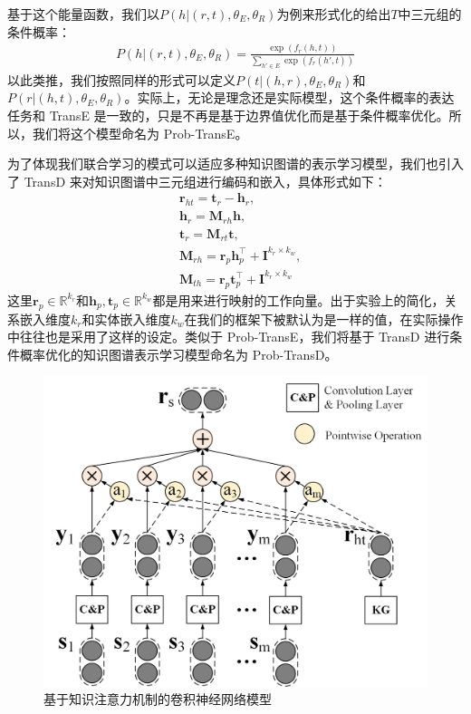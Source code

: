 基于这个能量函数，我们以$P(h|(r, t),{\theta_E, \theta_R})$为例来形式化的给出$T$中三元组的条件概率：
\begin{align}
P(h|(r, t),{\theta_E, \theta_R}) = \frac{\exp(f_r(h, t))}{\sum_{h' \in E} \exp(f_r(h', t))}
\end{align}
以此类推，我们按照同样的形式可以定义$P(t|(h, r), {\theta_E, \theta_R})$和$P(r|(h, t),{\theta_E, \theta_R})$。实际上，无论是理念还是实际模型，这个条件概率的表达任务和 TransE 是一致的，只是不再是基于边界值优化而是基于条件概率优化。所以，我们将这个模型命名为 Prob-TransE。

为了体现我们联合学习的模式可以适应多种知识图谱的表示学习模型，我们也引入了 TransD 来对知识图谱中三元组进行编码和嵌入，具体形式如下：
\begin{align}
&\textbf{r}_{ht} = \textbf{t}_{r} - \textbf{h}_{r}, \\\nonumber
&\textbf{h}_{r}  = \textbf{M}_{rh}\textbf{h},\\\nonumber 
&\textbf{t}_{r} = \textbf{M}_{rt}\textbf{t}, \\\nonumber
&\textbf{M}_{rh} = \textbf{r}_p\textbf{h}_p^{\top}+\textbf{I}^{k_r \times k_w},	\\\nonumber
&\textbf{M}_{th} = \textbf{r}_p\textbf{t}_p^{\top}+\textbf{I}^{k_r \times k_w}
\end{align}
这里$\textbf{r}_p \in \mathbb{R}^{k_r} $和$\textbf{h}_p, \textbf{t}_p \in \mathbb{R}^{k_w}$都是用来进行映射的工作向量。出于实验上的简化，关系嵌入维度$k_r$和实体嵌入维度$k_w$在我们的框架下被默认为是一样的值，在实际操作中往往也是采用了这样的设定。类似于 Prob-TransE，我们将基于 TransD 进行条件概率优化的知识图谱表示学习模型命名为 Prob-TransD。


\begin{figure}[t]
\centering
\includegraphics[width=0.9\columnwidth]{figures/ch3/cnn.jpg}
\caption{基于知识注意力机制的卷积神经网络模型}
\label{fig:cnn}
\end{figure}


